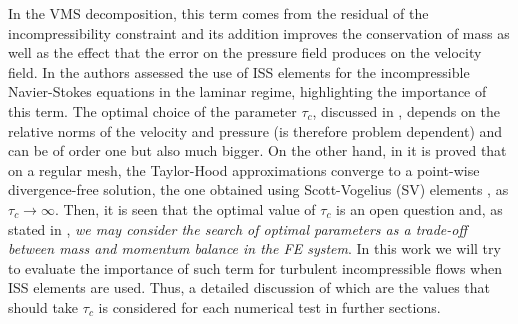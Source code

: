 In the VMS decomposition, this term comes from the residual of the incompressibility constraint and its addition improves the conservation of mass as well as the effect that the error on the pressure field produces on the velocity field. 
In \cite{olshanskii_graddiv_2009,gelhard_stabilized_2005} the authors assessed the use of ISS elements for the incompressible Navier-Stokes equations in the laminar regime, highlighting the importance of this term. The optimal choice of the parameter $\tau_c$, discussed in \cite{jenkins_parameter_2013}, depends on the relative norms of the velocity and pressure (is therefore problem dependent) and can be of order one but also much bigger. On the other hand, in \cite{case_connection_2011} it is proved that on a regular mesh, the Taylor-Hood approximations converge to a point-wise divergence-free solution, the one obtained using Scott-Vogelius (SV) elements \cite{scott_conforming_1985}, as $\tau_c\rightarrow\infty$. Then, it is seen that the optimal value of $\tau_c$ is an open question and, as stated in \cite{olshanskii_graddiv_2009}, \textit{we may consider the search of optimal parameters as a trade-off between mass and momentum balance in the FE system}. In this work we will try to evaluate the importance of such term for turbulent incompressible flows when ISS elements are used. Thus, a detailed discussion of which are the values that should take $\tau_c$ is considered for each numerical test in further sections.

